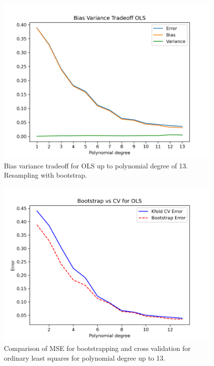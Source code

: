\documentclass{article}
\begin{document}
\begin{figure}[htbp]
    \centering
    \includegraphics[width=\textwidth*2/3]{Project1/figures/Terrain/Bias_Variance_Tradeoff_OLS_13.png}
    \caption{Bias variance tradeoff for OLS up to polynomial degree of 13. Resampling with bootstrap.}
    \label{fig:TerrainBVtradeoff}
\end{figure}


\begin{figure}[htbp]
    \centering
    \includegraphics[width=\textwidth*2/3]{Project1/figures/Terrain/Bias_vs_Var_OLS_13.png}
    \caption{Comparison of MSE for bootstrapping and cross validation for ordinary least squares for polynomial degree up to 13.}
    \label{fig:TerrainBvsCV}
\end{figure}
\end{document}
